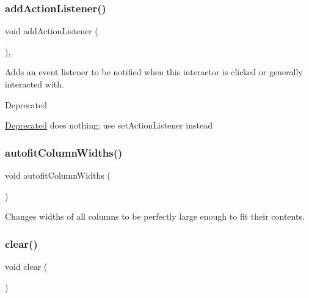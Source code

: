 \subsubsection{\texorpdfstring{add\+Action\+Listener()}{addActionListener()}}
{\footnotesize\ttfamily void add\+Action\+Listener (\begin{DoxyParamCaption}{ }\end{DoxyParamCaption})\hspace{0.3cm}{\ttfamily [virtual]}, {\ttfamily [inherited]}}



Adds an event listener to be notified when this interactor is clicked or generally interacted with. 

\begin{DoxyRefDesc}{Deprecated}
\item[\mbox{\hyperlink{deprecated__deprecated000006}{Deprecated}}]does nothing; use set\+Action\+Listener instead \end{DoxyRefDesc}
\mbox{\label{classGTable_afaf36ccb6a75432b5f5463613ef01ef4}} 
\subsubsection{\texorpdfstring{autofit\+Column\+Widths()}{autofitColumnWidths()}}
{\footnotesize\ttfamily void autofit\+Column\+Widths (\begin{DoxyParamCaption}{ }\end{DoxyParamCaption})\hspace{0.3cm}{\ttfamily [virtual]}}



Changes widths of all columns to be perfectly large enough to fit their contents. 

\mbox{\label{classGTable_ac8bb3912a3ce86b15842e79d0b421204}} 
\subsubsection{\texorpdfstring{clear()}{clear()}}
{\footnotesize\ttfamily void clear (\begin{DoxyParamCaption}{ }\end{DoxyParamCaption})\hspace{0.3cm}{\ttfamily [virtual]}}



